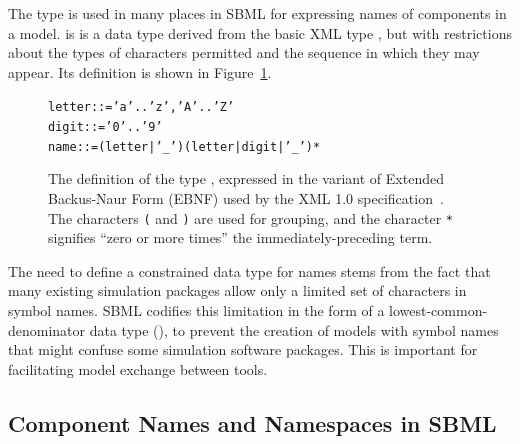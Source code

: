 \documentclass[10pt]{cekarticle}
\newcommand{\vref}[1]{\ref{#1}}
\newcommand{\changed}[1]{\textcolor{BrickRed}{#1}}
\begin{document}
The type  is used in many places in SBML for expressing names
of components in a model.   is is a data type derived from the
basic XML type , but with restrictions about the types of
characters permitted and the sequence in which they may appear.  Its 
definition is shown in Figure~\vref{fig:name}.

\begin{figure}[t]
  \vspace*{10pt}
  \centering
  \begin{minipage}{4.2in}
\begin{alltt}
  letter   ::= 'a'..'z','A'..'Z'
  digit    ::= '0'..'9'
  \changed{name     ::= ( letter | '_' ) ( letter | digit | '_' )*}
\end{alltt}
  \end{minipage}
\caption{\changed{The definition of the type , expressed in the
    variant of Extended Backus-Naur Form (EBNF) used by the XML 1.0
    specification~\protect\citep{bray:2000}.  The characters \texttt{(} and
    \texttt{)} are used for grouping, and the character \texttt{*}
    signifies ``zero or more times'' the immediately-preceding term.}}
  \label{fig:name}
\end{figure}    

The need to define a constrained data type for names stems from the fact
that many existing simulation packages allow only a limited set of
characters in symbol names.  SBML codifies this limitation in the form of a
lowest-common-denominator data type (), to prevent the
creation of models with symbol names that might confuse some simulation
software packages.  This is important for facilitating model exchange
between tools.


\subsection{Component Names and Namespaces in SBML}
\label{sec:namespaces}
\end{document}
